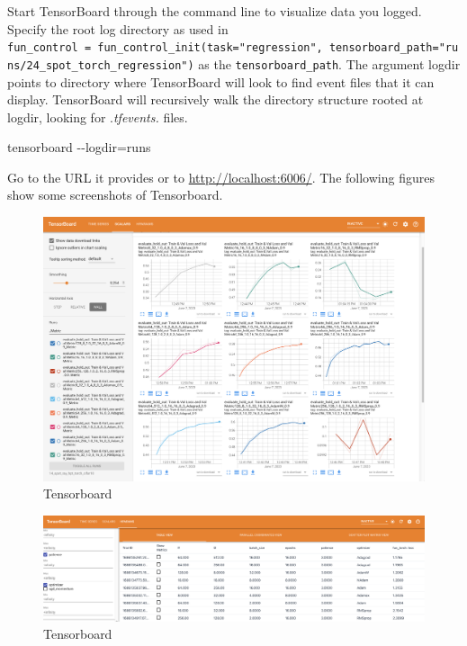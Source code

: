 \documentclass[
  letterpaper,
  DIV=11,
  numbers=noendperiod]{scrreprt}
\newenvironment{Shaded}{\begin{snugshade}}{\end{snugshade}}
\newcommand{\NormalTok}[1]{\textcolor[rgb]{0.00,0.23,0.31}{#1}}
\begin{document}
Start TensorBoard through the command line to visualize data you logged.
Specify the root log directory as used in
\texttt{fun\_control\ =\ fun\_control\_init(task="regression",\ tensorboard\_path="runs/24\_spot\_torch\_regression")}
as the \texttt{tensorboard\_path}. The argument logdir points to
directory where TensorBoard will look to find event files that it can
display. TensorBoard will recursively walk the directory structure
rooted at logdir, looking for .\emph{tfevents.} files.

\begin{Shaded}
\begin{Highlighting}[]
\NormalTok{tensorboard {-}{-}logdir=runs}
\end{Highlighting}
\end{Shaded}

Go to the URL it provides or to \url{http://localhost:6006/}. The
following figures show some screenshots of Tensorboard.

\begin{figure}

{\centering \includegraphics{./figures_static/14-torch_p040025_10min_5init_2023-06-07_12-41-06_tensorboard_01.png}

}

\caption{\label{fig-tensorboard_0}Tensorboard}

\end{figure}

\begin{figure}

{\centering \includegraphics{./figures_static/14-torch_p040025_10min_5init_2023-06-07_12-41-06_tensorboard_02.png}

}

\caption{\label{fig-tensorboard_hdparams}Tensorboard}

\end{figure}
\end{document}
